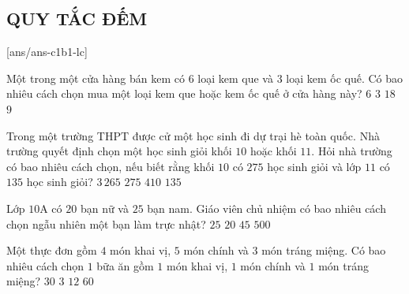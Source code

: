 \subsection{QUY TẮC ĐẾM}
 
\setcounter{ex}{0}
[ans/ans-c1b1-lc]
\begin{ex}%
	Một trong một cửa hàng bán kem có $6$ loại kem que và $3$ loại kem ốc quế. Có bao nhiêu cách chọn mua một loại kem que hoặc kem ốc quế ở cửa hàng này?
	\choice
	{$6$}
	{$3$}
	{$18$}
	{\True $9$} 
\end{ex}
\begin{ex}%
	Trong một trường THPT được cử một học sinh đi dự trại hè toàn quốc. Nhà trường quyết định chọn một học sinh giỏi khối $10$ hoặc khối $11$. Hỏi nhà trường có bao nhiêu cách chọn, nếu biết rằng khối $10$ có $275$ học sinh giỏi và lớp $11$ có $135$ học sinh giỏi?
	\choice
	{$3\,265$}
	{$275$}
	{\True $410$}
	{$135$}
\end{ex}
\begin{ex}%
	Lớp $10$A có $20$ bạn nữ và $25$ bạn nam. Giáo viên chủ nhiệm có bao nhiêu cách chọn ngẫu nhiên một bạn làm trực nhật?
	\choice
	{$25$}
	{$20$}
	{\True $45$}
	{$500$}
\end{ex}
\begin{ex}%
	Một thực đơn gồm $4$ món khai vị, $5$ món chính và $3$ món tráng miệng. Có bao nhiêu cách chọn $1$ bữa ăn gồm $1$ món khai vị, $1$ món chính và $1$ món tráng miệng?
	\choice
	{$30$}
	{$3$}
	{$12$}
	{\True $60$}
\end{ex}
